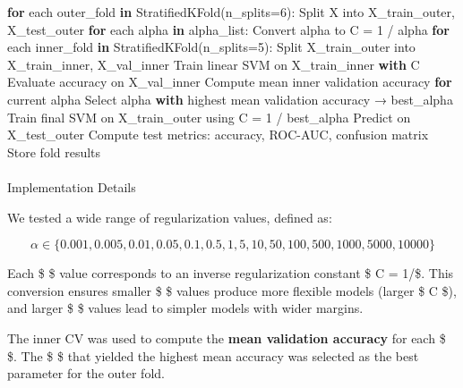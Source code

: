 \documentclass[
  letterpaper,
  DIV=11,
  numbers=noendperiod]{scrartcl}
\makeatletter
\let\oldparagraph\paragraph
\renewcommand{\paragraph}{
    \@ifstar
      \xxxParagraphStar
      \xxxParagraphNoStar
  }
\newcommand{\xxxParagraphStar}[1]{\oldparagraph*{#1}\mbox{}}
\newcommand{\xxxParagraphNoStar}[1]{\oldparagraph{#1}\mbox{}}
\newenvironment{Shaded}{\begin{snugshade}}{\end{snugshade}}
\newcommand{\ControlFlowTok}[1]{\textcolor[rgb]{0.00,0.23,0.31}{\textbf{#1}}}
\newcommand{\DecValTok}[1]{\textcolor[rgb]{0.68,0.00,0.00}{#1}}
\newcommand{\KeywordTok}[1]{\textcolor[rgb]{0.00,0.23,0.31}{\textbf{#1}}}
\newcommand{\NormalTok}[1]{\textcolor[rgb]{0.00,0.23,0.31}{#1}}
\newcommand{\OperatorTok}[1]{\textcolor[rgb]{0.37,0.37,0.37}{#1}}
\makeatother
\begin{document}
\begin{Shaded}
\begin{Highlighting}[]
\ControlFlowTok{for}\NormalTok{ each outer\_fold }\KeywordTok{in}\NormalTok{ StratifiedKFold(n\_splits}\OperatorTok{=}\DecValTok{6}\NormalTok{):}
\NormalTok{    Split X into X\_train\_outer, X\_test\_outer}
    \ControlFlowTok{for}\NormalTok{ each alpha }\KeywordTok{in}\NormalTok{ alpha\_list:}
\NormalTok{        Convert alpha to C }\OperatorTok{=} \DecValTok{1} \OperatorTok{/}\NormalTok{ alpha}
        \ControlFlowTok{for}\NormalTok{ each inner\_fold }\KeywordTok{in}\NormalTok{ StratifiedKFold(n\_splits}\OperatorTok{=}\DecValTok{5}\NormalTok{):}
\NormalTok{            Split X\_train\_outer into X\_train\_inner, X\_val\_inner}
\NormalTok{            Train linear SVM on X\_train\_inner }\ControlFlowTok{with}\NormalTok{ C}
\NormalTok{            Evaluate accuracy on X\_val\_inner}
\NormalTok{        Compute mean inner validation accuracy }\ControlFlowTok{for}\NormalTok{ current alpha}
\NormalTok{    Select alpha }\ControlFlowTok{with}\NormalTok{ highest mean validation accuracy → best\_alpha}
\NormalTok{    Train final SVM on X\_train\_outer using C }\OperatorTok{=} \DecValTok{1} \OperatorTok{/}\NormalTok{ best\_alpha}
\NormalTok{    Predict on X\_test\_outer}
\NormalTok{    Compute test metrics: accuracy, ROC}\OperatorTok{{-}}\NormalTok{AUC, confusion matrix}
\NormalTok{    Store fold results}
\end{Highlighting}
\end{Shaded}

\paragraph{Implementation Details}\label{implementation-details}

We tested a wide range of regularization values, defined as:

\[
\alpha \in \{0.001, 0.005, 0.01, 0.05, 0.1, 0.5, 1, 5, 10, 50, 100, 500, 1000, 5000, 10000\}
\]

Each \$ \alpha \$ value corresponds to an inverse regularization
constant \$ C = 1/\alpha \$. This conversion ensures smaller \$
\alpha \$ values produce more flexible models (larger \$ C \$), and
larger \$ \alpha \$ values lead to simpler models with wider margins.

The inner CV was used to compute the \textbf{mean validation accuracy}
for each \$ \alpha \$. The \$ \alpha \$ that yielded the highest mean
accuracy was selected as the best parameter for the outer fold.
\end{document}
